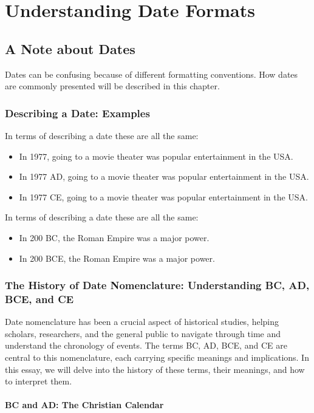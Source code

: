 \documentclass[a4paper,12pt]{book}
\begin{document}
\chapter{Understanding Date Formats}
\section*{A Note about Dates}
Dates can be confusing because of different formatting conventions. How dates are commonly presented will be described in this chapter.

\subsection*{Describing a Date: Examples}
In terms of describing a date these are all the same:

\begin{itemize}
    \item In 1977, going to a movie theater was popular entertainment in the USA.
    \item In 1977 AD, going to a movie theater was popular entertainment in the USA.
    \item In 1977 CE, going to a movie theater was popular entertainment in the USA.
\end{itemize}

In terms of describing a date these are all the same:

\begin{itemize}
    \item In 200 BC, the Roman Empire was a major power.
    \item In 200 BCE, the Roman Empire was a major power.
\end{itemize}

\subsection*{The History of Date Nomenclature: Understanding BC, AD, BCE, and CE}
Date nomenclature has been a crucial aspect of historical studies, helping scholars, researchers, and the general public to navigate through time and understand the chronology of events. The terms BC, AD, BCE, and CE are central to this nomenclature, each carrying specific meanings and implications. In this essay, we will delve into the history of these terms, their meanings, and how to interpret them.

\subsubsection*{BC and AD: The Christian Calendar}
\end{document}
